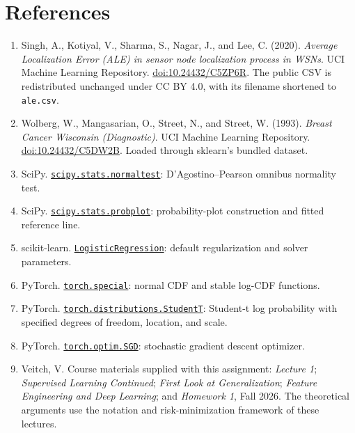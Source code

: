 \documentclass[10pt,letterpaper]{article}
\newcommand{\code}[1]{\texttt{#1}}
\begin{document}
\section*{References}
\small
\begin{enumerate}
\item Singh, A., Kotiyal, V., Sharma, S., Nagar, J., and Lee, C. (2020).
\emph{Average Localization Error (ALE) in sensor node localization process in
WSNs}. UCI Machine Learning Repository.
\href{https://doi.org/10.24432/C5ZP6R}{doi:10.24432/C5ZP6R}.
The public CSV is redistributed unchanged under CC BY 4.0, with its filename
shortened to \code{ale.csv}.
\item Wolberg, W., Mangasarian, O., Street, N., and Street, W. (1993).
\emph{Breast Cancer Wisconsin (Diagnostic)}. UCI Machine Learning Repository.
\href{https://doi.org/10.24432/C5DW2B}{doi:10.24432/C5DW2B}.
Loaded through sklearn's bundled dataset.
\item SciPy. \href{https://docs.scipy.org/doc/scipy/reference/generated/scipy.stats.normaltest.html}{\code{scipy.stats.normaltest}}:
D'Agostino--Pearson omnibus normality test.
\item SciPy. \href{https://docs.scipy.org/doc/scipy/reference/generated/scipy.stats.probplot.html}{\code{scipy.stats.probplot}}:
probability-plot construction and fitted reference line.
\item scikit-learn.
\href{https://scikit-learn.org/stable/modules/generated/sklearn.linear_model.LogisticRegression.html}{\code{LogisticRegression}}:
default regularization and solver parameters.
\item PyTorch.
\href{https://docs.pytorch.org/docs/2.14/special.html}{\code{torch.special}}:
normal CDF and stable log-CDF functions.
\item PyTorch.
\href{https://docs.pytorch.org/docs/2.14/distributions.html}{\code{torch.distributions.StudentT}}:
Student-t log probability with specified degrees of freedom, location, and scale.
\item PyTorch.
\href{https://docs.pytorch.org/docs/2.14/generated/torch.optim.SGD.html}{\code{torch.optim.SGD}}:
stochastic gradient descent optimizer.
\item Veitch, V. Course materials supplied with this assignment:
\emph{Lecture 1}; \emph{Supervised Learning Continued};
\emph{First Look at Generalization}; \emph{Feature Engineering and Deep Learning};
and \emph{Homework 1}, Fall 2026. The theoretical arguments use the notation
and risk-minimization framework of these lectures.
\end{enumerate}
\end{document}

